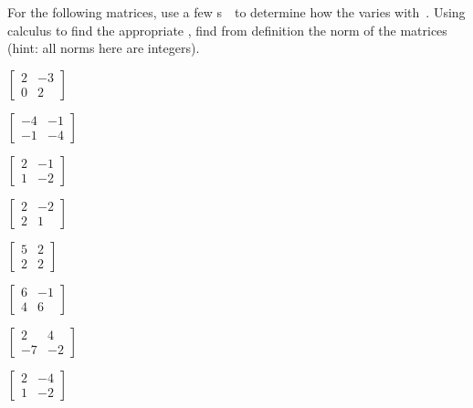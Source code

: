 \begin{exercise} \label{eg:}
For the following matrices, use a few s~\xv\ to determine how the  varies with~\xv.
Using calculus to find the appropriate , find from definition the norm of the matrices (hint: all norms here are integers).
\begin{parts}
\item \(\begin{bmatrix} 2&-3\\0&2 \end{bmatrix}\)
\item \(\begin{bmatrix} -4&-1\\-1&-4 \end{bmatrix}\)
\item \(\begin{bmatrix} 2&-1\\1&-2 \end{bmatrix}\)
\item \(\begin{bmatrix} 2&-2\\2&1 \end{bmatrix}\)
\item \(\begin{bmatrix} 5&2\\2&2 \end{bmatrix}\)
\item \(\begin{bmatrix} 6&-1\\4&6 \end{bmatrix}\)
\item \(\begin{bmatrix} 2&4\\-7&-2 \end{bmatrix}\)
\item \(\begin{bmatrix} 2&-4\\1&-2 \end{bmatrix}\)
\end{parts}
\begin{comment}
\begin{verbatim}
format rat
for i=1:99
a=round(randn(2)*4); [~,d]=rat(svd(a),1e-6);
if max(d(:))<7, if sum(abs(a(:))>0)>2, as=[a svd(a)], end, end
end
\end{verbatim}
\end{comment}
\end{exercise}




